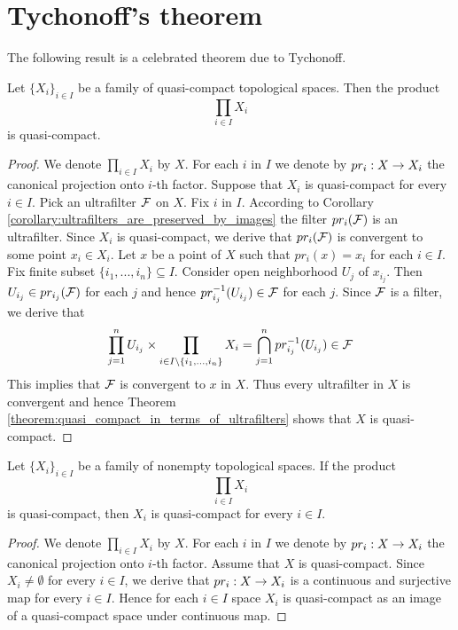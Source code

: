 \documentclass[10pt]{amsart}
\begin{document}
\section{Tychonoff's theorem}
\noindent
The following result is a celebrated theorem due to Tychonoff.

\begin{theorem}\label{theorem:Tychonoff_theorem}
	Let $\big\{X_i\big\}_{i\in I}$ be a family of quasi-compact topological spaces. Then the product
	$$\prod_{i\in I}X_i$$
	is quasi-compact.
\end{theorem}
\begin{proof}
	We denote $\prod_{i\in I}X_i$ by $X$. For each $i$ in $I$ we denote by $pr_i:X \rightarrow X_i$ the canonical projection onto $i$-th factor. Suppose that $X_i$ is quasi-compact for every $i\in I$. Pick an ultrafilter ${\mathcal F}$ on $X$. Fix $i$ in $I$. According to Corollary \ref{corollary:ultrafilters_are_preserved_by_images} the filter $pr_i({\mathcal F})$ is an ultrafilter. Since $X_i$ is quasi-compact, we derive that $pr_i({\mathcal F})$ is convergent to some point $x_i \in X_i$. Let $x$ be a point of $X$ such that $pr_i(x) = x_i$ for each $i\in I$. Fix finite subset $\{i_1,...,i_n\}\subseteq I$. Consider open neighborhood $U_j$ of $x_{i_j}$. Then $U_{i_j}\in pr_{i_j}({\mathcal F})$ for each $j$ and hence $pr_{i_j}^{-1}(U_{i_j}) \in {\mathcal F}$ for each $j$. Since ${\mathcal F}$ is a filter, we derive that
	$$\prod_{j=1}^nU_{i_j}\times \prod_{i\in I \setminus \{i_1,...,i_n\}}X_i = \bigcap_{j=1}^n pr^{-1}_{i_j}(U_{i_j}) \in {\mathcal F}$$
	This implies that ${\mathcal F}$ is convergent to $x$ in $X$. Thus every ultrafilter in $X$ is convergent and hence Theorem \ref{theorem:quasi_compact_in_terms_of_ultrafilters} shows that $X$ is quasi-compact.
\end{proof}

\begin{theorem}\label{theorem:Tychonoff_theorem_converse}
	Let $\big\{X_i\big\}_{i\in I}$ be a family of nonempty topological spaces. If the product
	$$\prod_{i\in I}X_i$$
	is quasi-compact, then $X_i$ is quasi-compact for every $i\in I$.
\end{theorem}
\begin{proof}
	We denote $\prod_{i\in I}X_i$ by $X$. For each $i$ in $I$ we denote by $pr_i:X \rightarrow X_i$ the canonical projection onto $i$-th factor. Assume that $X$ is quasi-compact. Since $X_i \neq \emptyset$ for every $i\in I$, we derive that $pr_i:X\rightarrow X_i$ is a continuous and surjective map for every $i\in I$. Hence for each $i\in I$ space $X_i$ is quasi-compact as an image of a quasi-compact space under continuous map.
\end{proof}
\end{document}
